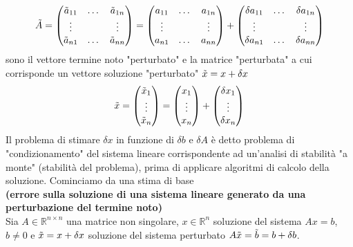 \documentclass[12pt,a4paper]{article}
\begin{document}
\begin{equation*}
    \Tilde{A} =
    \begin{pmatrix}
        \Tilde{a}_{11} & \dots & \Tilde{a}_{1n} \\
        \vdots & & \vdots \\
        \Tilde{a}_{n1} & \dots & \Tilde{a}_{nn}
    \end{pmatrix} = 
    \begin{pmatrix}
        a_{11} & \dots & a_{1n} \\
        \vdots & & \vdots  \\
        a_{n1} & \dots & a_{nn}
    \end{pmatrix} +
    \begin{pmatrix}
        \delta a_{11} & \dots & \delta a_{1n} \\
        \vdots & & \vdots \\
        \delta a_{n1} & \dots & \delta a_{nn}
    \end{pmatrix}
\end{equation*}
sono il vettore termine noto "perturbato" e la matrice "perturbata" a cui corrisponde un vettore soluzione "perturbato" $\Tilde{x}=x+\delta x$
\begin{equation*}
    \Tilde{x}= 
    \begin{pmatrix}
    \Tilde{x}_1\\  
    \vdots\\ 
    \Tilde{x}_n
\end{pmatrix} =
\begin{pmatrix}
    x_1\\  
    \vdots\\ 
    x_n
\end{pmatrix} + 
\begin{pmatrix}
    \delta x_1\\  
    \vdots\\ 
    \delta x_n
\end{pmatrix}
\end{equation*}
Il problema di stimare $\delta x$ in funzione di $\delta b$ e $\delta A$ è detto problema di "condizionamento" del sistema lineare corrispondente ad un'analisi di stabilità "a monte" (stabilità del problema), prima di applicare algoritmi di calcolo della soluzione.
Cominciamo da una stima di base\\
\textbf{ (errore sulla soluzione di una sistema lineare generato da una perturbazione del termine noto)}\\
Sia $A \in \mathbb{R}^{n\times n}$ una matrice non singolare, $x \in \mathbb{R}^n$ soluzione del sistema $Ax=b$, $b \neq 0$ e $\Tilde{x}=x+\delta x$ soluzione del sistema perturbato $A\Tilde{x}=\Tilde{b}=b+\delta b$.\\
\end{document}
